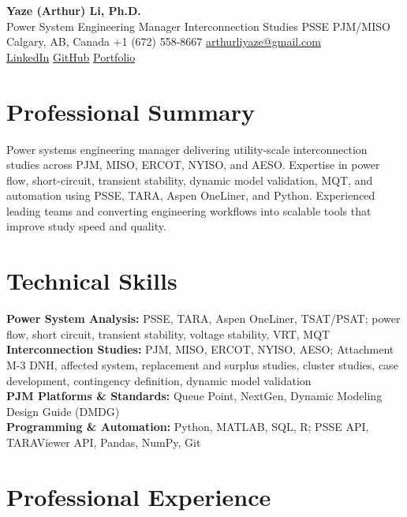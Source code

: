 \documentclass[10pt,letterpaper]{article}
\begin{document}
\begin{center}
{\LARGE \textbf{Yaze (Arthur) Li, Ph.D.}}\\[2pt]
{\small Power System Engineering Manager \textbar{} Interconnection Studies \textbar{} PSS\textregistered{}E \textbar{} PJM/MISO}\\[3pt]
{\small Calgary, AB, Canada \textbar{} +1 (672) 558-8667 \textbar{}
\href{mailto:arthurliyaze@gmail.com}{arthurliyaze@gmail.com}}\\[-1pt]
{\small \href{https://www.linkedin.com/in/yaze-li-6b436a228}{LinkedIn} \textbar{}
\href{https://github.com/Arthurliyaze}{GitHub} \textbar{}
\href{https://arthurliyaze.github.io}{Portfolio}}
\end{center}

\section{Professional Summary}
Power systems engineering manager delivering utility-scale interconnection studies across PJM, MISO, ERCOT, NYISO, and AESO. Expertise in power flow, short-circuit, transient stability, dynamic model validation, MQT, and automation using PSS\textregistered{}E, TARA, Aspen OneLiner, and Python. Experienced leading teams and converting engineering workflows into scalable tools that improve study speed and quality.

\section{Technical Skills}
\textbf{Power System Analysis:} PSS\textregistered{}E, TARA, Aspen OneLiner, TSAT/PSAT; power flow, short circuit, transient stability, voltage stability, VRT, MQT\\
\textbf{Interconnection Studies:} PJM, MISO, ERCOT, NYISO, AESO; Attachment M-3 DNH, affected system, replacement and surplus studies, cluster studies, case development, contingency definition, dynamic model validation\\
\textbf{PJM Platforms \& Standards:} Queue Point, NextGen, Dynamic Modeling Design Guide (DMDG)\\
\textbf{Programming \& Automation:} Python, MATLAB, SQL, R; PSS\textregistered{}E API, TARAViewer API, Pandas, NumPy, Git

\section{Professional Experience}
\end{document}
